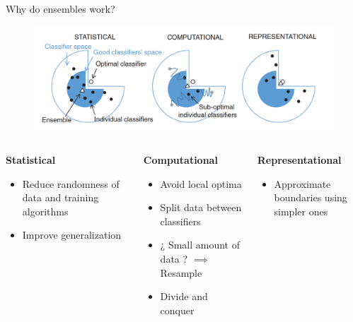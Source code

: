 \documentclass[xcolor=table]{beamer}
\begin{document}
\begin{frame}{Why do ensembles work?}
\begin{figure}
\centering
    \includegraphics[scale=0.3]{Images/ReasonsEnsemblesWork.png}
    \end{figure}


{\tiny
\begin{columns}
\begin{column}{0.3\textwidth}
\textbf{Statistical}\\
\begin{itemize}
    \item Reduce randomness of data and training algorithms
    \item Improve generalization
\end{itemize}

\end{column}
\begin{column}{0.3\textwidth} 
\textbf{Computational}\\
\begin{itemize}
    \item Avoid local optima
    \item Split data between classifiers
    \item ¿ Small amount of data ? \(\implies\) Resample
    \item Divide and conquer
\end{itemize}
\end{column}
\begin{column}{0.3\textwidth}
\textbf{Representational}\\
\begin{itemize}
    \item Approximate boundaries using simpler ones
\end{itemize}
\end{column}
\end{columns}
}
\end{frame}
\end{document}
